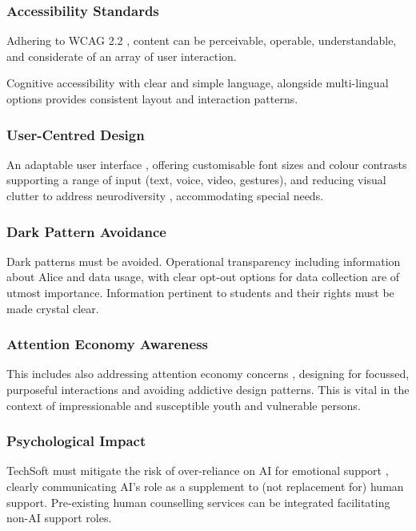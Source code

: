 \documentclass[14pt,a4paper]{article}
\begin{document}
\begin{multicols}{2}
\subsubsection{Accessibility Standards}
Adhering to WCAG 2.2 \textit{\parencite{W3C2024}}, content can be perceivable, operable, understandable, and considerate of an array of user interaction.

Cognitive accessibility \textit{\parencite[pp. 1-10]{Yesilada2024}} with clear and simple language, alongside multi-lingual options \textit{\parencite[pp. 50-100]{AnastasiouSchaler2024}} provides consistent layout and interaction patterns.

\subsubsection{User-Centred Design}
An adaptable user interface \textit{\parencite[pp. 20-50]{HarperYesilada2024}}, offering customisable font sizes and colour contrasts supporting a range of input (text, voice, video, gestures), and reducing visual clutter to address neurodiversity \textit{\parencite[pp. 30-60]{Armstrong2024}}, accommodating special needs.

\subsubsection{Dark Pattern Avoidance}
Dark patterns \textit{\parencite{Brignull2024}} must be avoided.
Operational transparency including information about Alice and data usage, with clear opt-out options for data collection are of utmost importance.
Information pertinent to students and their rights must be made crystal clear.

\subsubsection{Attention Economy Awareness}
This includes also addressing attention economy concerns \textit{\parencite[pp. 10-30]{Williams2024}}, designing for focussed, purposeful interactions and avoiding addictive design patterns.
This is vital in the context of impressionable and susceptible youth and vulnerable persons.

\subsubsection{Psychological Impact}
TechSoft must mitigate the risk of over-reliance on AI for emotional support \textit{\parencite[p. 746]{Miner2022}}, clearly communicating AI's role as a supplement to (not replacement for) human support.
Pre-existing human counselling services can be integrated facilitating non-AI support roles.


\end{multicols}
\end{document}
